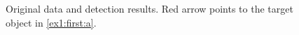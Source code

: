 \begin{figure}
\centering
{}
\caption[Original data and detection results]{Original data and detection results. Red arrow points to the target object in \ref{ex1:first:a}.}
\label{ex1:first}
\end{figure}

